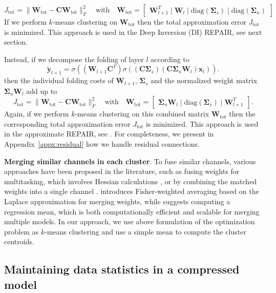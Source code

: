 \documentclass{article}
\newcommand\fakeparagraph[1]{\par\noindent\textbf{{#1}}.\xspace}
\begin{document}
{\[
    J_\text{tot} = \|\mathbf{W}_\text{tot} - \mathbf{C} \mathbf{W}_\text{tot}\|_F^2 \quad \text{with} \quad \mathbf{W}_\text{tot} = 
        \begin{bmatrix}\mathbf{W}_{l+1}^T  \mid \mathbf{W}_l \mid \text{diag}(\mathbf{\Sigma}_s)  \mid \text{diag}(\mathbf{\Sigma}_n) \end{bmatrix}
\]
If we perform $k$-means clustering on $\mathbf{W}_\text{tot}$ then the total approximation error $J_\text{tot}$ is minimized. This approach is used in the Deep Inversion (DI) REPAIR, see next section. 

Instead, if we decompose the folding of layer $l$ according to
\[
    \mathbf{\tilde{y}}_{l+1} = \sigma((\mathbf{W}_{l+1} \mathbf{C}^T) \sigma((\mathbf{C} \mathbf{\Sigma}_s) (\mathbf{C} \mathbf{\Sigma}_n \mathbf{W}_l) \mathbf{x}_l)).
\]
then the individual folding costs of $\mathbf{W}_{l+1}$, $\mathbf{\Sigma}_s$ and the normalized weight matrix $\mathbf{\Sigma}_n \mathbf{W}_l$ add up to
\[
    J_\text{tot} = \|\mathbf{W}_\text{tot} - \mathbf{C} \mathbf{W}_\text{tot}\|_F^2 \quad \text{with} \quad \mathbf{W}_\text{tot} = 
        \begin{bmatrix}
            \mathbf{\Sigma}_n \mathbf{W}_l \mid \text{diag}(\mathbf{\Sigma}_s) \mid \mathbf{W}_{l+1}^T
        \end{bmatrix}.
\]
Again, if we perform $k$-means clustering on this combined matrix $\mathbf{W}_\text{tot}$ then the corresponding total approximation error $J_\text{tot}$ is minimized. This approach is used in the approximate REPAIR, see . For completeness, we present in Appendix~\ref{appx:residual} how we handle residual connections.

\fakeparagraph{Merging similar channels in each cluster}
To fuse similar channels, various approaches have been proposed in the literature, such as fusing weights for multitasking, which involves Hessian calculations \citep{he2018multi}, or by combining the matched weights into a single channel \citep{chen2023going}. \citep{matena2022mergingmodelsfisherweightedaveraging} introduces Fisher-weighted averaging based on the Laplace approximation for merging weights, while \citep{jin2023datalessknowledgefusionmerging} suggests computing a regression mean, which is both computationally efficient and scalable for merging multiple models. In our approach, we use above formulation of the optimization problem as $k$-means clustering and use a simple mean to compute the cluster centroids.


\subsection{Maintaining data statistics in a compressed model}
\label{subsec:repair}

}
\end{document}
